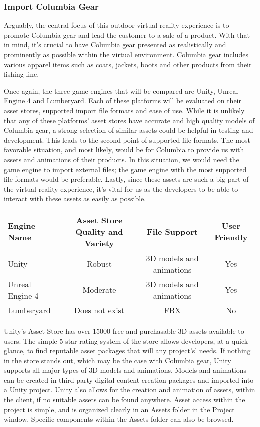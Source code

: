 \documentclass[10pt,journal,compsoc,onecolumn, draftclsnofoot]{IEEEtran}
\begin{document}
\subsubsection{Import Columbia Gear}
Arguably, the central focus of this outdoor virtual reality experience is to promote Columbia gear and lead the customer to a sale of a product. With that in mind, it's crucial to have Columbia gear presented as realistically and prominently as possible within the virtual environment. Columbia gear includes various apparel items such as coats, jackets, boots and other products from their fishing line.

Once again, the three game engines that will be compared are Unity, Unreal Engine 4 and Lumberyard. Each of these platforms will be evaluated on their asset stores, supported import file formats and ease of use. While it is unlikely that any of these platforms' asset stores have accurate and high quality models of Columbia gear, a strong selection of similar assets could be helpful in testing and development. This leads to the second point of supported file formats. The most favorable situation, and most likely, would be for Columbia to provide us with assets and animations of their products. In this situation, we would need the game engine to import external files; the game engine with the most supported file formats would be preferable. Lastly, since these assets are such a big part of the virtual reality experience, it's vital for us as the developers to be able to interact with these assets as easily as possible.

\vspace{2mm}
\begin{table}[h!]
\centering
  \begin{tabular}{ | l || c | c | c | }
  \hline
  Engine Name & Asset Store Quality and Variety & File Support & User Friendly\\
  \hline
  Unity & Robust & 3D models and animations & Yes\\ \hline
  Unreal Engine 4 & Moderate & 3D models and animations & Yes\\ \hline
  Lumberyard & Does not exist & FBX & No\\ \hline
  \end{tabular}
\end{table}
\vspace{2mm}

Unity's Asset Store has over 15000 free and purchasable 3D assets available to users. The simple 5 star rating system of the store allows developers, at a quick glance, to find reputable asset packages that will any project's' needs. If nothing in the store stands out, which may be the case with Columbia gear, Unity supports all major types of 3D models and animations. Models and animations can be created in third party digital content creation packages and imported into a Unity project. Unity also allows for the creation and animation of assets, within the client, if no suitable assets can be found anywhere. Asset access within the project is simple, and is organized clearly in an Assets folder in the Project window. Specific components within the Assets folder can also be browsed.
\end{document}
